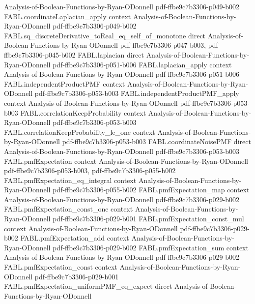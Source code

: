 \begin{theorem}
  {Analysis-of-Boolean-Functions-by-Ryan-ODonnell}
  {pdf-ffbe9c7b3306-p049-b002}
\proofstep
  {FABL.coordinateLaplacian_apply}
  {context}
  {Analysis-of-Boolean-Functions-by-Ryan-ODonnell}
  {pdf-ffbe9c7b3306-p049-b002}
\proofstep
  {FABL.sq_discreteDerivative_toReal_eq_self_of_monotone}
  {direct}
  {Analysis-of-Boolean-Functions-by-Ryan-ODonnell}
  {pdf-ffbe9c7b3306-p047-b003,
    pdf-ffbe9c7b3306-p045-b002}
\proofstep
  {FABL.laplacian}
  {direct}
  {Analysis-of-Boolean-Functions-by-Ryan-ODonnell}
  {pdf-ffbe9c7b3306-p051-b006}
\proofstep
  {FABL.laplacian_apply}
  {context}
  {Analysis-of-Boolean-Functions-by-Ryan-ODonnell}
  {pdf-ffbe9c7b3306-p051-b006}
\proofstep
  {FABL.independentProductPMF}
  {context}
  {Analysis-of-Boolean-Functions-by-Ryan-ODonnell}
  {pdf-ffbe9c7b3306-p053-b003}
\proofstep
  {FABL.independentProductPMF_apply}
  {context}
  {Analysis-of-Boolean-Functions-by-Ryan-ODonnell}
  {pdf-ffbe9c7b3306-p053-b003}
\proofstep
  {FABL.correlationKeepProbability}
  {context}
  {Analysis-of-Boolean-Functions-by-Ryan-ODonnell}
  {pdf-ffbe9c7b3306-p053-b003}
\proofstep
  {FABL.correlationKeepProbability_le_one}
  {context}
  {Analysis-of-Boolean-Functions-by-Ryan-ODonnell}
  {pdf-ffbe9c7b3306-p053-b003}
\proofstep
  {FABL.coordinateNoisePMF}
  {direct}
  {Analysis-of-Boolean-Functions-by-Ryan-ODonnell}
  {pdf-ffbe9c7b3306-p053-b003}
\proofstep
  {FABL.pmfExpectation}
  {context}
  {Analysis-of-Boolean-Functions-by-Ryan-ODonnell}
  {pdf-ffbe9c7b3306-p053-b003,
    pdf-ffbe9c7b3306-p055-b002}
\proofstep
  {FABL.pmfExpectation_eq_integral}
  {context}
  {Analysis-of-Boolean-Functions-by-Ryan-ODonnell}
  {pdf-ffbe9c7b3306-p055-b002}
\proofstep
  {FABL.pmfExpectation_map}
  {context}
  {Analysis-of-Boolean-Functions-by-Ryan-ODonnell}
  {pdf-ffbe9c7b3306-p029-b002}
\proofstep
  {FABL.pmfExpectation_const_one}
  {context}
  {Analysis-of-Boolean-Functions-by-Ryan-ODonnell}
  {pdf-ffbe9c7b3306-p029-b001}
\proofstep
  {FABL.pmfExpectation_const_mul}
  {context}
  {Analysis-of-Boolean-Functions-by-Ryan-ODonnell}
  {pdf-ffbe9c7b3306-p029-b002}
\proofstep
  {FABL.pmfExpectation_add}
  {context}
  {Analysis-of-Boolean-Functions-by-Ryan-ODonnell}
  {pdf-ffbe9c7b3306-p029-b002}
\proofstep
  {FABL.pmfExpectation_sum}
  {context}
  {Analysis-of-Boolean-Functions-by-Ryan-ODonnell}
  {pdf-ffbe9c7b3306-p029-b002}
\proofstep
  {FABL.pmfExpectation_const}
  {context}
  {Analysis-of-Boolean-Functions-by-Ryan-ODonnell}
  {pdf-ffbe9c7b3306-p029-b001}
\proofstep
  {FABL.pmfExpectation_uniformPMF_eq_expect}
  {direct}
  {Analysis-of-Boolean-Functions-by-Ryan-ODonnell}

\end{theorem}
